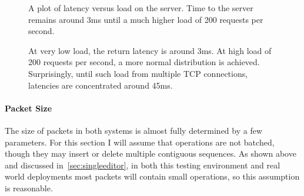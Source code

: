 \documentclass[12pt,a4paper,twoside,openright]{report}
\begin{document}
			
			\begin{figure}[H]
				\centering
					
				\caption[Client-Server Latency] {A plot of latency versus load on the server. Time to the server remains around 3ms until a much higher load of 200 requests per second.}
				\label{fig:latency-cs}
			\end{figure}
			\begin{figure}[H]
				\centering
					
				\caption[Server-Client Latencies] {At very low load, the return latency is around 3ms. At high load of 200 requests per second, a more normal distribution is achieved. Surprisingly, until such load from multiple TCP connections, latencies are concentrated around 45ms.}
				\label{fig:latency-sc}
			\end{figure}
	
		
		\paragraph{Packet Size}
			The size of packets in both systems is almost fully determined by a few parameters. For this section I will assume that operations are not batched, though they may insert or delete multiple contiguous sequences. As shown above and discussed in~\cref{sec:singleeditor}, in both this testing environment and real world deployments most packets will contain small operations, so this assumption is reasonable.
			
\end{document}
